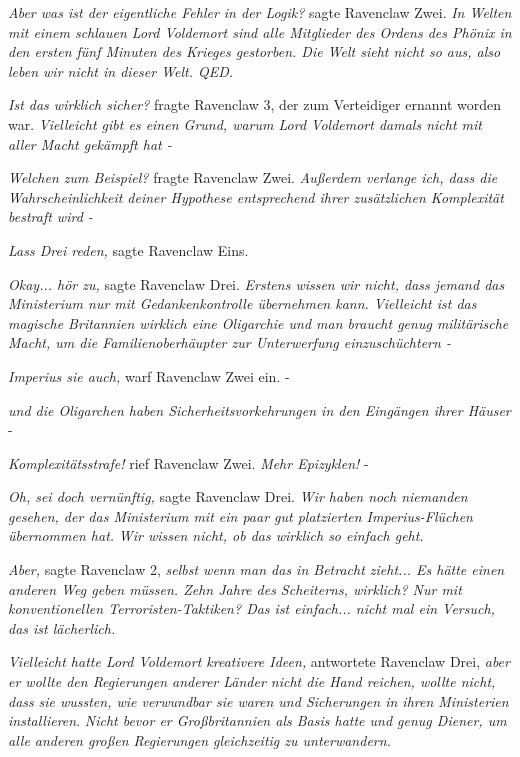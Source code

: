 \emph{Aber was ist der eigentliche Fehler in der Logik?} sagte Ravenclaw Zwei.
\emph{In Welten mit einem schlauen Lord Voldemort sind alle Mitglieder des
Ordens des Phönix in den ersten fünf Minuten des Krieges gestorben. Die Welt
sieht nicht so aus, also leben wir nicht in dieser Welt. QED.}

\emph{Ist das wirklich sicher?} fragte Ravenclaw 3, der zum Verteidiger ernannt
worden war. \emph{Vielleicht gibt es einen Grund, warum Lord Voldemort damals
nicht mit aller Macht gekämpft hat -}

\emph{Welchen zum Beispiel?} fragte Ravenclaw Zwei. \emph{Außerdem verlange ich,
dass die Wahrscheinlichkeit deiner Hypothese entsprechend ihrer zusätzlichen
Komplexität bestraft wird -}

\emph{Lass Drei reden,} sagte Ravenclaw Eins.

\emph{Okay... hör zu,} sagte Ravenclaw Drei. \emph{Erstens wissen wir nicht,
dass jemand das Ministerium nur mit Gedankenkontrolle übernehmen kann.
Vielleicht ist das magische Britannien wirklich eine Oligarchie und man braucht
genug militärische Macht, um die Familienoberhäupter zur Unterwerfung
einzuschüchtern -}

\emph{Imperius sie auch,} warf Ravenclaw Zwei ein. -

\emph{und die Oligarchen haben Sicherheitsvorkehrungen in den Eingängen ihrer
Häuser} -

\emph{Komplexitätsstrafe!} rief Ravenclaw Zwei. \emph{Mehr Epizyklen!} -

\emph{Oh, sei doch vernünftig,} sagte Ravenclaw Drei. \emph{Wir haben noch
niemanden gesehen, der das Ministerium mit ein paar gut platzierten
Imperius-Flüchen übernommen hat.} \emph{Wir wissen nicht, ob das wirklich so
einfach geht.}

\emph{Aber,} sagte Ravenclaw 2, \emph{selbst wenn man das in Betracht zieht...
Es hätte einen anderen Weg geben müssen. Zehn Jahre des Scheiterns, wirklich?
Nur mit konventionellen Terroristen-Taktiken? Das ist einfach... nicht mal ein
Versuch, das ist lächerlich.}

\emph{Vielleicht hatte Lord Voldemort kreativere Ideen,} antwortete Ravenclaw
Drei,\emph{ aber er wollte den Regierungen anderer Länder nicht die Hand
reichen, wollte nicht, dass} \emph{sie wussten, wie verwundbar sie waren und
Sicherungen in ihren Ministerien installieren}. \emph{Nicht bevor er
Großbritannien als Basis hatte und genug Diener, um alle anderen großen
Regierungen gleichzeitig zu unterwandern.}

